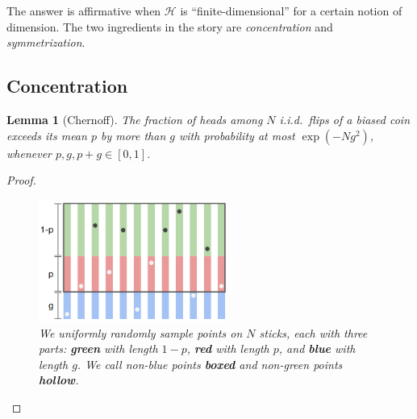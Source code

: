 \documentclass[twocolumn]{article}
\newcommand{\Hh}{\mathcal{H}}
\newtheorem{lem}{Lemma}
\theoremstyle{definition}
\begin{document}
        The answer is affirmative when $\Hh$ is ``finite-dimensional'' for a
        certain notion of dimension.  The two ingredients in the story are
        \emph{concentration} and \emph{symmetrization}.

    \subsection*{Concentration}

        \begin{lem}[Chernoff]
            The fraction of heads among $N$ i.i.d.\ flips of a biased coin
            exceeds its mean $p$ by more than $g$ with probability at most 
            $\exp(-Ng^2)$, whenever $p, g, p+g \in[0,1]$.
        \end{lem}

        \begin{proof}
                \begin{figure}[h!]
                    \centering
                    \includegraphics[height=4cm]{chernoff}
                    \caption{\emph{
                        We uniformly randomly sample points on $N$
                        sticks, each with three parts: \textbf{green}
                        with length $1-p$, \textbf{red} with length $p$, and
                        \textbf{blue} with length $g$.  We call non-blue points
                        \textbf{boxed} and non-green points \textbf{hollow}.
                    }}
                    \label{fig:chernoff}
                \end{figure}


\end{proof}
\end{document}
